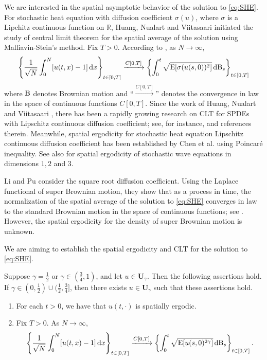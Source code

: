 \documentclass[12pt, reqno]{amsart}
\newcommand{\R}{{\mathbb{R}}}
\newcommand{\E}{\mathrm{E}}
\renewcommand{\d}{\mathrm{d}}
\newcommand{\<}{\langle}
\renewcommand{\>}{\rangle}
\begin{document}
We are interested in the spatial asymptotic behavior of the solution to \eqref{eq:SHE}.  For stochastic heat equation with diffusion coefficient
$\sigma(u)$, where $\sigma$ is a Lipchitz continuous function on $\R$, Huang, Nualart and Viitasaari \cite{HNV20} initiated the study of 
central limit theorem for the spatial average of the solution using Malliavin-Stein's method.  Fix $T>0$.  According to \cite[Theorem 1.2]{HNV20},  as $N\to\infty$,
          \begin{align*}
         \left\{ \frac{1}{\sqrt{N}}\int_0^{N}[u(t, x) -1] \, \d x\right\}_{t\in [0, T]}	\xrightarrow{C[0,T]} \left\{\int_0^{t}\sqrt{\E[\sigma(u(s, 0))^2]}\, \d {\rm B}_s\right\}_{t\in [0, T]}
          \end{align*}
where ${\rm B}$ denotes  Brownian motion and ``$\xrightarrow{C[0,T]}$'' denotes the convergence in law in the space of continuous functions $C[0,T]$. Since the work of Huang, Nualart and Viitasaari \cite{HNV20},  there has been a rapidly growing research on CLT for SPDEs with Lipschitz continuous diffusion coefficient; see, for instance, \cite{BNZ21,DNZ20, Ebi24, Ebi25, HNVZ20, NXZ22} and references therein.
Meanwhile, spatial ergodicity for stochastic heat equation Lipschitz continuous diffusion coefficient has been established by Chen et al. \cite{CKNP21} using Poincar\'e inequality.  See also \cite{NZ20} for spatial ergodicity of stochastic wave equations in dimensions $1, 2$ and $3$.



Li and Pu \cite{LP23} consider the square root diffusion coefficient. Using the Laplace functional of super Brownian motion, they show that 
as a process in time, 
the normalization of the spatial average of the solution to \eqref{eq:SHE}  converges in law to the standard Brownian motion in the space of continuous functions; see \cite[Theorem 1.1]{LP23}. However, the spatial ergodicity for the density of super Brownian motion is unknown. 



We are aiming to establish the spatial ergodicity and CLT for the solution to \eqref{eq:SHE}.


\begin{theorem}\label{th:CLT}
          Suppose $\gamma=\frac{1}{2}$ or $\gamma\in(\frac{3}{4},1)$, and 
let $u\in\mathbf{U}_\gamma$.  Then the following assertions hold.  If 
$\gamma\in (0, \frac12)\cup(\frac{1}{2},\frac{3}{4}]$, then there exists 
$u\in\mathbf{U}_\gamma$ such that these assertions hold.  
\begin{enumerate}
\item For each $t>0$, we have that $u(t,\cdot)$ is spatially ergodic.
\item  Fix $T>0$. As $N\to\infty$, 
          \begin{align*}
         \left\{ \frac{1}{\sqrt{N}}\int_0^{N}[u(t, x) -1] \, \d x\right\}_{t\in [0, T]}	\xrightarrow{C[0,T]} \left\{\int_0^{t}\sqrt{\E[u(s, 0)^{2\gamma}]}\, \d {\rm B}_s\right\}_{t\in [0, T]}.
          \end{align*}
\end{enumerate}
\end{theorem}
\end{document}

